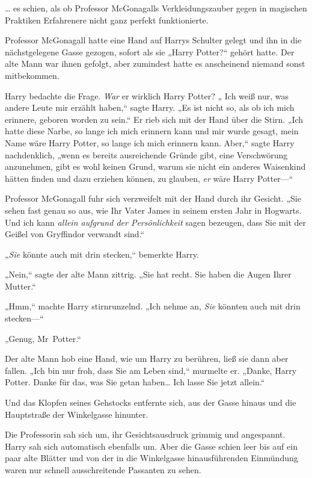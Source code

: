 {… es schien, als ob Professor McGonagalls Verkleidungszauber gegen in magischen Praktiken Erfahrenere nicht ganz perfekt funktionierte.

Professor McGonagall hatte eine Hand auf Harrys Schulter gelegt und ihn in die nächstgelegene Gasse gezogen, sofort als sie „Harry Potter?“ gehört hatte. Der alte Mann war ihnen gefolgt, aber zumindest hatte es anscheinend niemand sonst mitbekommen.

Harry bedachte die Frage. \emph{War} er wirklich Harry Potter? „ Ich weiß nur, was andere Leute mir erzählt haben,“ sagte Harry. „Es ist nicht so, als ob ich mich erinnere, geboren worden zu sein.“ Er rieb sich mit der Hand über die Stirn. „Ich hatte diese Narbe, so lange ich mich erinnern kann und mir wurde gesagt, mein Name wäre Harry Potter, so lange ich mich erinnern kann. Aber,“ sagte Harry nachdenklich, „wenn es bereits ausreichende Gründe gibt, eine Verschwörung anzunehmen, gibt es wohl keinen Grund, warum sie nicht ein anderes Waisenkind hätten finden und dazu erziehen können, zu glauben, \emph{er} wäre Harry Potter—“

Professor McGonagall fuhr sich verzweifelt mit der Hand durch ihr Gesicht. „Sie sehen fast genau so aus, wie Ihr Vater James in seinem ersten Jahr in Hogwarts. Und ich kann \emph{allein aufgrund der Persönlichkeit} sagen bezeugen, dass Sie mit der Geißel von Gryffindor verwandt sind.“

„\emph{Sie} könnte auch mit drin stecken,“ bemerkte Harry.

„Nein,“ sagte der alte Mann zittrig. „Sie hat recht. Sie haben die Augen Ihrer Mutter.“

„Hmm,“ machte Harry stirnrunzelnd. „Ich nehme an, \emph{Sie} könnten auch mit drin stecken—“

„Genug, Mr~Potter.“

Der alte Mann hob eine Hand, wie um Harry zu berühren, ließ sie dann aber fallen. „Ich bin nur froh, dass Sie am Leben sind,“ murmelte er. „Danke, Harry Potter. Danke für das, was Sie getan haben… Ich lasse Sie jetzt allein.“

Und das Klopfen seines Gehstocks entfernte sich, aus der Gasse hinaus und die Hauptstraße der Winkelgasse hinunter.

Die Professorin sah sich um, ihr Gesichtsausdruck grimmig und angespannt. Harry sah sich automatisch ebenfalls um. Aber die Gasse schien leer bis auf ein paar alte Blätter und von der in die Winkelgasse hinausführenden Einmündung waren nur schnell ausschreitende Passanten zu sehen.

}
